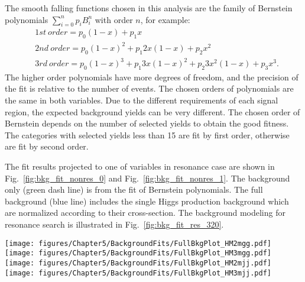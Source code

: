 The smooth falling functions chosen in this analysis are the family of Bernstein polynomials $\sum\limits_{i=0}^{n} p_{i}B^{n}_{i}$ with order $n$, for example:
\begin{equation} \label{eq:Bernstein}
  \begin{aligned}
	& 1st~order = p_{0}(1-x) + p_{1}x \\
	& 2nd~order = p_{0}(1-x)^{2} + p_{1}2x(1-x) + p_{2}x^{2} \\
	& 3rd~order = p_{0}(1-x)^{3} + p_{1}3x(1-x)^{2}+ p_{2}3x^{2}(1-x) + p_{3}x^{3}. 
  \end{aligned}
\end{equation}
The higher order polynomials have more degrees of freedom, %
and the precision of the fit is relative to the number of events.
The chosen orders of polynomials are the same in both variables.
Due to the different requirements of each signal region, the expected background yields can be very different.
The chosen order of Bernstein depends on the number of selected yields to obtain the good fitness. %
The categories with selected yields less than 15 are fit by first order, otherwise are fit by second order.

The fit results projected to one of variables in resonance case are shown in Fig.~\ref{fig:bkg_fit_nonres_0} and Fig.~\ref{fig:bkg_fit_nonres_1}.
The background only (green dash line) is from the fit of Bernstein polynomials.
The full background (blue line) includes the single Higgs production background which are normalized according to their cross-section.
The background modeling for resonance search is illustrated in Fig.~\ref{fig:bkg_fit_res_320}.

\begin{figure*}[!htbp]
  \centering
  \texttt{[image: figures/Chapter5/BackgroundFits/FullBkgPlot\_HM2mgg.pdf]}\hfil
  \texttt{[image: figures/Chapter5/BackgroundFits/FullBkgPlot\_HM3mgg.pdf]}\hfil
  \texttt{[image: figures/Chapter5/BackgroundFits/FullBkgPlot\_HM2mjj.pdf]}\hfil
  \texttt{[image: figures/Chapter5/BackgroundFits/FullBkgPlot\_HM3mjj.pdf]}\hfil
  \caption{Background fits for the SM \HH non-resonant analysis in the high mass region. The plots on the left (right) show the distributions in the HPC (MPC) region.}
  \label{fig:bkg_fit_nonres_0}
\end{figure*}

